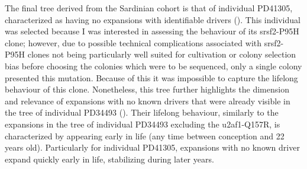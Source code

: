 \begin{figure}[!ht]
	\label{fig:tree-pd34493}
\end{figure}

The final tree derived from the Sardinian cohort is that of individual PD41305, characterized as having no expansions with identifiable drivers (). This individual was selected because I was interested in assessing the behaviour of its \ac{srsf2}-P95H clone; however, due to possible technical complications associated with \ac{srsf2}-P95H clones not being particularly well suited for cultivation or colony selection bias before choosing the colonies which were to be sequenced, only a single colony presented this mutation. Because of this it was impossible to capture the lifelong behaviour of this clone. Nonetheless, this tree further highlights the dimension and relevance of expansions with no known drivers that were already visible in the tree of individual PD34493 (). Their lifelong behaviour, similarly to the expansions in the tree of individual PD34493 excluding the \ac{u2af1}-Q157R, is characterized by appearing early in life (any time between conception and 22 years old). Particularly for individual PD41305, expansions with no known driver expand quickly early in life, stabilizing during later years.

\begin{figure}[!ht]
	\label{fig:tree-pd41305}
\end{figure}

